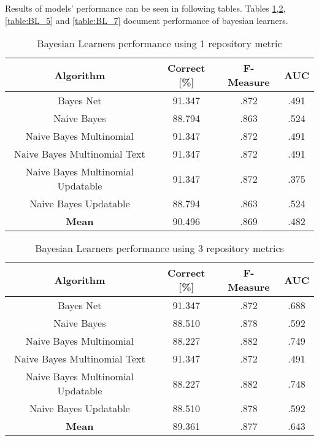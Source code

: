 Results of models' performance can be seen in following tables. Tables \ref{table:BL_1},\ref{table:BL_3}, \ref{table:BL_5} and \ref{table:BL_7} document performance of bayesian learners.


\begin{table}[h!]
\centering
\begin{tabular}{ |c|c|c|c| }
 \hline
 \textbf{Algorithm} & \textbf{Correct [\%]} & \textbf{F-Measure} & \textbf{AUC}  \\
 \hline
 Bayes Net & 91.347 & .872 & .491    \\
 \hline
 Naive Bayes &  88.794 & .863 & .524   \\
 \hline
  Naive Bayes Multinomial & 91.347 & .872 & .491\\
 \hline
  Naive Bayes Multinomial Text & 91.347 & .872 & .491  \\
 \hline
  Naive Bayes Multinomial Updatable & 91.347 & .872 & .375 \\
 \hline
  Naive Bayes Updatable & 88.794 & .863 & .524 \\
 \hline
 \textbf{Mean}  & 90.496 & .869 & .482 \\
 \hline

\end{tabular}
\caption{Bayesian Learners performance using 1 repository metric}
\label{table:BL_1}
\end{table}

\begin{table}[h!]
\centering
\begin{tabular}{ |c|c|c|c| }
 \hline
 \textbf{Algorithm} & \textbf{Correct [\%]} & \textbf{F-Measure} & \textbf{AUC}  \\
 \hline
 Bayes Net & 91.347 & .872 & .688    \\
 \hline
 Naive Bayes &  88.510 & .878 & .592   \\
 \hline
  Naive Bayes Multinomial & 88.227 & .882 & .749\\
 \hline
  Naive Bayes Multinomial Text & 91.347 & .872 & .491  \\
 \hline
  Naive Bayes Multinomial Updatable & 88.227 & .882 & .748 \\
 \hline
  Naive Bayes Updatable & 88.510 & .878 & .592 \\
 \hline
 \textbf{Mean}  & 89.361 & .877 & .643 \\
 \hline

\end{tabular}
\caption{Bayesian Learners performance using 3 repository metrics}
\label{table:BL_3}
\end{table}

